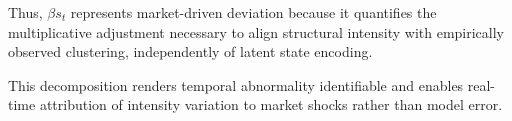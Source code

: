 Thus, $\beta s_t$ represents market-driven deviation because it quantifies the multiplicative adjustment necessary to align structural intensity with empirically observed clustering, independently of latent state encoding.

This decomposition renders temporal abnormality identifiable and enables real-time attribution of intensity variation to market shocks rather than model error.










